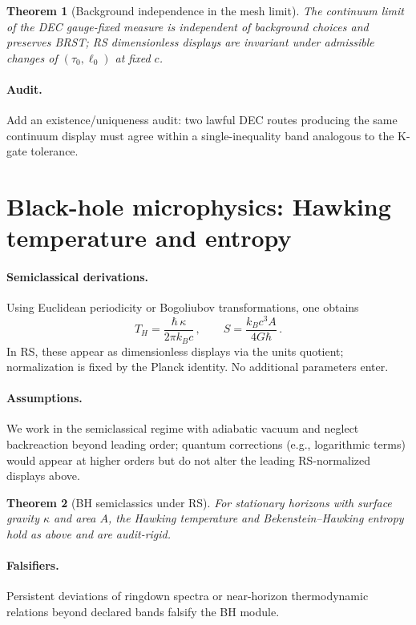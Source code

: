 \documentclass[11pt]{article}
\newtheorem{theorem}{Theorem}[section]
\begin{document}
\begin{theorem}[Background independence in the mesh limit]
The continuum limit of the DEC gauge-fixed measure is independent of background choices and preserves BRST; RS dimensionless displays are invariant under admissible changes of $(\tau_0,\ell_0)$ at fixed $c$.\end{theorem}

\paragraph{Audit.} Add an existence/uniqueness audit: two lawful DEC routes producing the same continuum display must agree within a single-inequality band analogous to the K-gate tolerance.

\section{Black-hole microphysics: Hawking temperature and entropy}
\label{sec:bh}

\paragraph{Semiclassical derivations.}
Using Euclidean periodicity or Bogoliubov transformations, one obtains
\[
T_H = \frac{\hbar\,\kappa}{2\pi k_B c}\,,\qquad S = \frac{k_B c^3 A}{4 G\hbar}\,.
\]
In RS, these appear as dimensionless displays via the units quotient; normalization is fixed by the Planck identity. No additional parameters enter.

\paragraph{Assumptions.}
We work in the semiclassical regime with adiabatic vacuum and neglect backreaction beyond leading order; quantum corrections (e.g., logarithmic terms) would appear at higher orders but do not alter the leading RS-normalized displays above.

\begin{theorem}[BH semiclassics under RS]
For stationary horizons with surface gravity $\kappa$ and area $A$, the Hawking temperature and Bekenstein--Hawking entropy hold as above and are audit-rigid.\end{theorem}

\paragraph{Falsifiers.} Persistent deviations of ringdown spectra or near-horizon thermodynamic relations beyond declared bands falsify the BH module.
\end{document}
